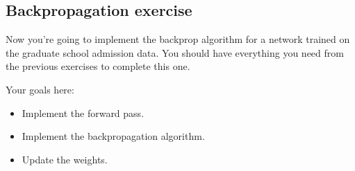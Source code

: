 \subsection{Backpropagation exercise}

Now you're going to implement the backprop algorithm for a network trained on the graduate school admission data. You should have everything you need from the previous exercises to complete this one.

Your goals here:

\begin{itemize}
    \item Implement the forward pass.
    \item Implement the backpropagation algorithm.
    \item Update the weights.
\end{itemize}


